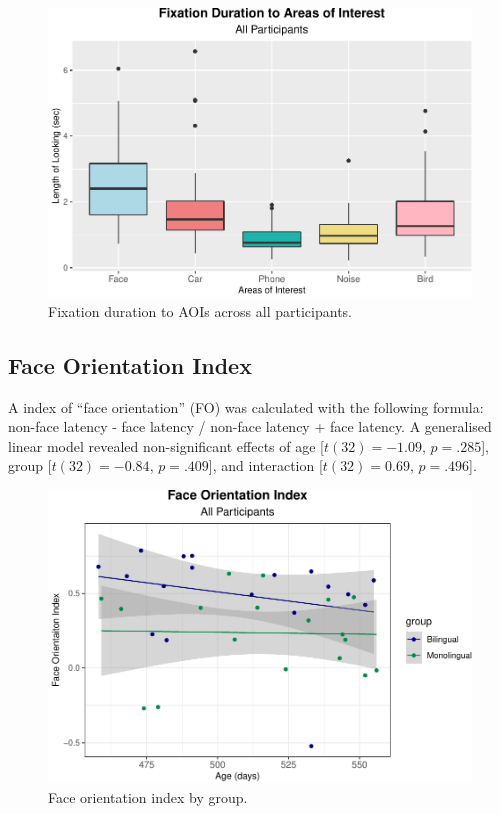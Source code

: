 \documentclass[english,man,floatsintext]{apa6}
\begin{document}
\begin{figure}
\includegraphics{Effects_of_early_language_experience_on_infants_files/figure-latex/alldurplot-1} \caption{Fixation duration to AOIs across all participants.}\label{fig:alldurplot}
\end{figure}

\hypertarget{face-orientation-index}{%
\subsection{Face Orientation Index}\label{face-orientation-index}}

A index of \enquote{face orientation} (FO) was calculated with the following formula: non-face latency - face latency / non-face latency + face latency. A generalised linear model revealed non-significant effects of age {[}\(t(32) = -1.09\), \(p = .285\){]}, group {[}\(t(32) = -0.84\), \(p = .409\){]}, and interaction {[}\(t(32) = 0.69\), \(p = .496\){]}.

\begin{figure}
\includegraphics{Effects_of_early_language_experience_on_infants_files/figure-latex/FOM-1} \caption{Face orientation index by group.}\label{fig:FOM}
\end{figure}
\end{document}
